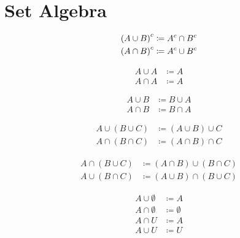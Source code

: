 \section{Set Algebra}
\begin{definition}
\begin{align}
    {(A \cup B)}^{c} &\coloneqq {A}^{c} \cap {B}^{c} \\
    {(A \cap B)}^{c} &\coloneqq {A}^{c} \cup {B}^{c}
\end{align}
\end{definition}

\begin{definition}
\begin{align}
    A \cup A &\coloneqq A \\
    A \cap A &\coloneqq A
\end{align}
\end{definition}

\begin{definition}
\begin{align}
    A \cup B &\coloneqq B \cup A \\
    A \cap B &\coloneqq B \cap A
\end{align}
\end{definition}

\begin{definition}
\begin{align}
    A \cup (B \cup C) &\coloneqq (A \cup B) \cup C \\
    A \cap (B \cap C) &\coloneqq (A \cap B) \cap C
\end{align}
\end{definition}

\begin{definition}
\begin{align}
    A \cap (B \cup C) &\coloneqq (A \cap B) \cup (B \cap C)\\
    A \cup (B \cap C) &\coloneqq (A \cup B) \cap (B \cup C)
\end{align}
\end{definition}

\begin{definition}
\begin{align}
    A \cup \emptyset &\coloneqq A \\
    A \cap \emptyset &\coloneqq \emptyset \\
    A \cap U &\coloneqq A \\
    A \cup U &\coloneqq U
\end{align}
\end{definition}

